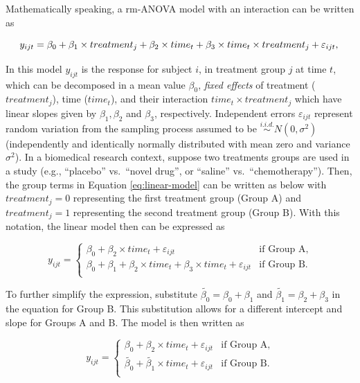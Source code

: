 \documentclass[
]{article}
\begin{document}
Mathematically speaking, a rm-ANOVA model with an interaction can be written as

\begin{equation}
y_{ijt} = \beta_0+\beta_1 \times treatment_{j} +\beta_2 \times time_{t} +\beta_3 \times time_{t}\times treatment_{j}+\varepsilon_{ijt},\\ 
\label{eq:linear-model}
\end{equation}

In this model \(y_{ijt}\) is the response for subject \(i\), in treatment group \(j\) at time \(t\), which can be decomposed in a mean value \(\beta_0\), \emph{fixed effects} of treatment (\(treatment_j\)), time (\(time_t\)), and their interaction \(time_t\times treatment_j\) which have linear slopes given by \(\beta_1, \beta_2\) and \(\beta_3\), respectively. Independent errors \(\varepsilon_{ijt}\) represent random variation from the sampling process assumed to be \(\stackrel{i.i.d.}\sim N(0,\sigma^2)\) (independently and identically normally distributed with mean zero and variance \(\sigma^2\)).
In a biomedical research context, suppose two treatments groups are used in a study (e.g., ``placebo'' vs.~``novel drug'', or ``saline'' vs.~``chemotherapy''). Then, the group terms in Equation \eqref{eq:linear-model} can be written as below with \(treatment_j=0\) representing the first treatment group (Group A) and \(treatment_j=1\) representing the second treatment group (Group B). With this notation, the linear model then can be expressed as

\begin{equation}
y_{ijt} = \begin{cases}
\beta_0 + \beta_2\times time_{t}+\varepsilon_{ijt}   & \mbox{if Group A},\\
\beta_0 + \beta_1+\beta_2 \times time_{t} +\beta_3 \times time_{t}+\varepsilon_{ijt}  & \mbox{if Group B}.\\
\end{cases}
\label{eq:ANOVA-by-group}
\end{equation}

To further simplify the expression, substitute \(\widetilde{\beta_{0}}=\beta_0+\beta_{1}\) and \(\widetilde{\beta_{1}}=\beta_{2}+\beta_{3}\) in the equation for Group B. This substitution allows for a different intercept and slope for Groups A and B. The model is then written as

\begin{equation}
y_{ijt} = \begin{cases}
\beta_0 + \beta_2\times time_{t}+\varepsilon_{ijt}   & \mbox{if Group A},\\
\widetilde{\beta_{0}} + \widetilde{\beta_1} \times time_{t}+\varepsilon_{ijt}  & \mbox{if Group B}.\\
\end{cases}
\label{eq:ANOVA-lines}
\end{equation}
\end{document}
